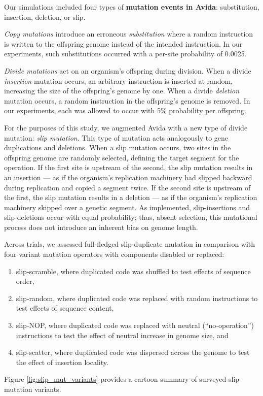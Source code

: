 

Our simulations included four types of \textbf{mutation events in Avida}: substitution, insertion, deletion, or slip.

\textit{Copy mutations} introduce an erroneous \textit{substitution} where a random instruction is written to the offspring genome instead of the intended instruction.
In our experiments, such substitutions occurred with a per-site probability of 0.0025.

\textit{Divide mutations} act on an organism's offspring during division.
When a divide \textit{insertion} mutation occurs, an arbitrary instruction is inserted at random, increasing the size of the offspring's genome by one.
When a divide \textit{deletion} mutation occurs, a random instruction in the offspring's genome is removed.
In our experiments, each was allowed to occur with 5\% probability per offspring.

For the purposes of this study, we augmented Avida with a new type of divide mutation: \textit{slip mutation}.
This type of mutation acts analogously to gene duplications and deletions.
When a slip mutation occurs, two sites in the offspring genome are randomly selected, defining the target segment for the operation.
If the first site is upstream of the second, the slip mutation results in an insertion --- as if the organism's replication machinery had slipped backward during replication and copied a segment twice.
If the second site is upstream of the first, the slip mutation results in a deletion --- as if the organism's replication machinery skipped over a genetic segment.
As implemented, slip-insertions and slip-deletions occur with equal probability; thus, absent selection, this mutational process does not introduce an inherent bias on genome length.

Across trials, we assessed full-fledged slip-duplicate mutation in comparison with four variant mutation operators with components disabled or replaced:
\begin{enumerate}
\item slip-scramble, where duplicated code was shuffled to test effects of sequence order,
\item slip-random, where duplicated code was replaced with random instructions to test effects of sequence content,
\item slip-NOP, where duplicated code was replaced with neutral (``no-operation'') instructions to test the effect of neutral increase in genome size, and
\item slip-scatter, where duplicated code was dispersed across the genome to test the effect of insertion locality.
\end{enumerate}
Figure \ref{fig:slip_mut_variants} provides a cartoon summary of surveyed slip-mutation variants.

